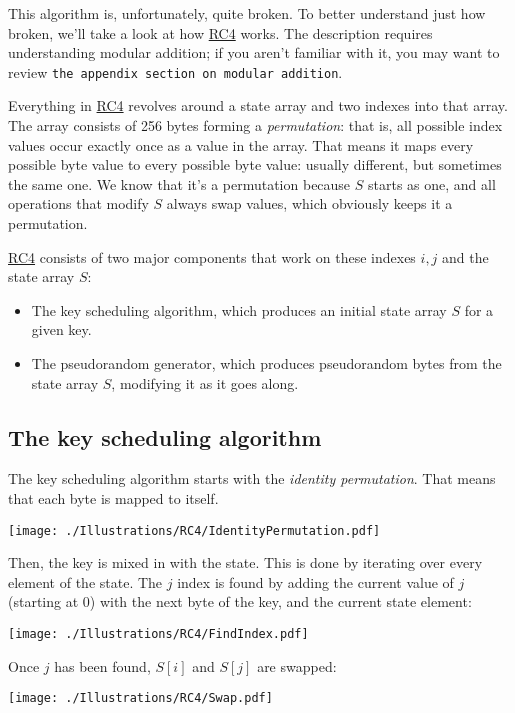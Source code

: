 \documentclass[11pt,ebook,table,dvipsnames]{memoir}
\begin{document}
This algorithm is, unfortunately, quite broken. To better understand
just how broken, we'll take a look at how \hyperref[RC4]{RC4} works. The description
requires understanding modular addition; if you aren't familiar with
it, you may want to review \texttt{the appendix section on modular addition}.

Everything in \hyperref[RC4]{RC4} revolves around a state array and two indexes into
that array. The array consists of 256 bytes forming a \emph{permutation}:
that is, all possible index values occur exactly once as a value in
the array. That means it maps every possible byte value to every
possible byte value: usually different, but sometimes the same one. We
know that it's a permutation because $S$ starts as one, and all
operations that modify $S$ always swap values, which obviously keeps
it a permutation.

\hyperref[RC4]{RC4} consists of two major components that work on these indexes $i, j$
and the state array $S$:

\begin{itemize}
\item The key scheduling algorithm, which produces an initial state array
$S$ for a given key.
\item The pseudorandom generator, which produces pseudorandom bytes from
the state array $S$, modifying it as it goes along.
\end{itemize}

\subsection{The key scheduling algorithm}
\label{sec-2-3-11-1}

The key scheduling algorithm starts with the \emph{identity permutation}.
That means that each byte is mapped to itself.

\texttt{[image: ./Illustrations/RC4/IdentityPermutation.pdf]}

Then, the key is mixed in with the state. This is done by iterating
over every element of the state. The $j$ index is found by adding the
current value of $j$ (starting at 0) with the next byte of the key,
and the current state element:

\texttt{[image: ./Illustrations/RC4/FindIndex.pdf]}

Once $j$ has been found, $S[i]$ and $S[j]$ are swapped:

\texttt{[image: ./Illustrations/RC4/Swap.pdf]}
\end{document}
